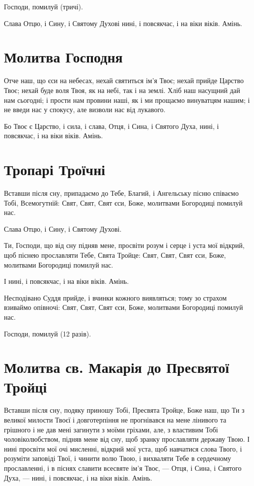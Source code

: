 \documentclass[chapters.tex]{subfiles}
\begin{document}
Господи, помилуй (тричі).

Слава Отцю, і Сину, і Святому Духові нині, і повсякчас, і на віки віків. Амінь.

\section{Молитва Господня}
Отче наш, що єси на небесах, нехай святиться ім’я Твоє; нехай прийде Царство Твоє; нехай буде воля Твоя, як на небі, так і на землі. Хліб наш насущний дай нам сьогодні; і прости нам провини наші, як і ми прощаємо винуватцям нашим; і не введи нас у спокусу, але визволи нас від лукавого.

Бо Твоє є Царство, і сила, і слава, Отця, і Сина, і Святого Духа, нині, і повсякчас, і на віки віків. Амінь.

\section{Тропарі Троїчні}

Вставши після сну, припадаємо до Тебе, Благий, і Ангельську пісню співаємо Тобі, Всемогутній: Свят, Свят, Свят єси, Боже, молитвами Богородиці помилуй нас.

Слава Отцю, і Сину, і Святому Духові.

Ти, Господи, що від сну підняв мене, просвіти розум і серце і уста мої відкрий, щоб піснею прославляти Тебе, Свята Тройце: Свят, Свят, Свят єси, Боже, молитвами Богородиці помилуй нас.

І нині, і повсякчас, і на віки віків. Амінь.

Несподівано Суддя прийде, і вчинки кожного виявляться; тому зо страхом взиваймо опівночі: Свят, Свят, Свят єси, Боже, молитвами Богородиці помилуй нас.

Господи, помилуй (12 разів).

\section{Молитва св. Макарія до Пресвятої Тройці}

Вставши після сну, подяку приношу Тобі, Пресвята Тройце, Боже наш, що Ти з великої милости Твоєї і довготерпіння не прогнівався на мене лінивого та грішного і не дав мені загинути з моїми гріхами, але, з властивим Тобі чоловіколюбством, підняв мене від сну, щоб зранку прославляти державу Твою. І нині просвіти мої очі мисленні, відкрий мої уста, щоб навчатися слова Твого, і розуміти заповіді Твої, і чинити волю Твою, і вихваляти Тебе в сердечному прославленні, і в піснях славити всесвяте ім’я Твоє, — Отця, і Сина, і Святого Духа, — нині, і повсякчас, і на віки віків. Амінь.
\end{document}
